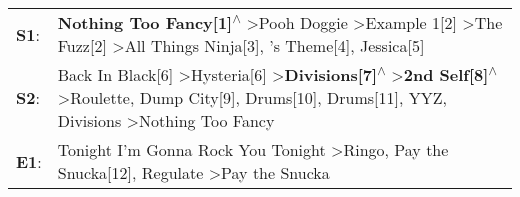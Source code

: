 \begin{supertabular}{p{0.03\textwidth}p{0.92\textwidth}}
 \textbf{S1}:  &                                                                                                                                                                        \textbf{Nothing Too Fancy[1]\textsuperscript{$\wedge$}} \textgreater \enspace Pooh Doggie\textsuperscript{} \textgreater \enspace Example 1[2]\textsuperscript{} \textgreater \enspace The Fuzz[2]\textsuperscript{} \textgreater \enspace All Things Ninja[3]\textsuperscript{}, 's Theme[4]\textsuperscript{}, \enspace Jessica[5]\textsuperscript{}  \enspace  \\
 \textbf{S2}:  &  Back In Black[6]\textsuperscript{} \textgreater \enspace Hysteria[6]\textsuperscript{} \textgreater \enspace \textbf{Divisions[7]\textsuperscript{$\wedge$}} \textgreater \enspace \textbf{2nd Self[8]\textsuperscript{$\wedge$}} \textgreater \enspace Roulette\textsuperscript{}, \enspace Dump City[9]\textsuperscript{}, \enspace Drums[10]\textsuperscript{}, \enspace Drums[11]\textsuperscript{}, \enspace YYZ\textsuperscript{}, \enspace Divisions\textsuperscript{} \textgreater \enspace Nothing Too Fancy\textsuperscript{}  \enspace  \\
 \textbf{E1}:  &                                                                                                                                                                                                                                                                                            Tonight I'm Gonna Rock You Tonight\textsuperscript{} \textgreater \enspace Ringo\textsuperscript{}, \enspace Pay the Snucka[12]\textsuperscript{}, \enspace Regulate\textsuperscript{} \textgreater \enspace Pay the Snucka\textsuperscript{}  \enspace  \\
\end{supertabular}
